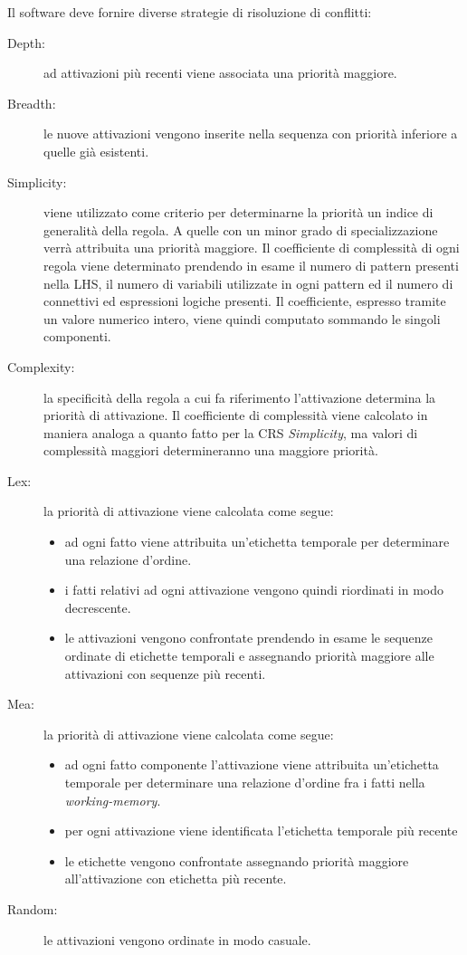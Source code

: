 Il software deve fornire diverse strategie di risoluzione di conflitti:
\begin{description}
	\item[Depth:] ad attivazioni più recenti viene associata una priorità maggiore.
	
	\item[Breadth:] le nuove attivazioni vengono inserite nella sequenza con priorità inferiore a quelle già esistenti.
	
	\item[Simplicity:] viene utilizzato come criterio per determinarne la priorità un indice di generalità della regola. A quelle con un minor grado di specializzazione verrà attribuita una priorità maggiore. Il coefficiente di complessità di ogni regola viene determinato prendendo in esame il numero di pattern presenti nella LHS, il numero di variabili utilizzate in ogni pattern ed il numero di connettivi ed espressioni logiche presenti. Il coefficiente, espresso tramite un valore numerico intero, viene quindi computato sommando le singoli componenti.
	
	\item[Complexity:] la specificità della regola a cui fa riferimento l'attivazione determina la priorità di attivazione. Il coefficiente di complessità viene calcolato in maniera analoga a quanto fatto per la CRS \emph{Simplicity}, ma valori di complessità maggiori determineranno una maggiore priorità.
	\item[Lex:] la priorità di attivazione viene calcolata come segue:
		\begin{itemize}
			\item ad ogni fatto viene attribuita un'etichetta temporale per determinare una relazione d'ordine.
			\item i fatti relativi ad ogni attivazione vengono quindi riordinati in modo decrescente.
			\item le attivazioni vengono confrontate prendendo in esame le sequenze ordinate di etichette temporali e assegnando priorità maggiore alle attivazioni con sequenze più recenti.
		\end{itemize}
	\item[Mea:] la priorità di attivazione viene calcolata come segue:
		\begin{itemize}
			\item ad ogni fatto componente l'attivazione viene attribuita un'etichetta temporale per determinare una relazione d'ordine fra i fatti nella \emph{working-memory}.
			\item per ogni attivazione viene identificata l'etichetta temporale più recente
			\item le etichette vengono confrontate assegnando priorità maggiore all'attivazione con etichetta più recente.
		\end{itemize}
	\item[Random:] le attivazioni vengono ordinate in modo casuale.
\end{description}

